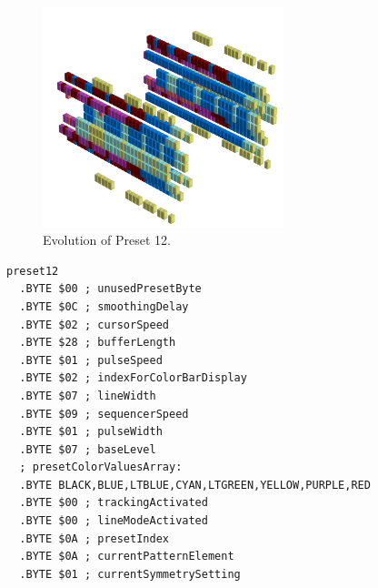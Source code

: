 \vspace*{-0.7cm}
\begin{minipage}[b]{0.48\linewidth}


                                                                 
\begin{figure}[H]                                                          
  \centering                                                             
  \begin{adjustbox}{width=7cm,center}                                   
  \includegraphics[width=7cm]{src/presets/pattern12-45.png}%
  \end{adjustbox}                                                        
\caption{Evolution of Preset 12.}                                           
\end{figure}                                                               
                                                                 
                                                                           
\end{minipage}
\hspace{0.1cm}
\begin{minipage}[b]{0.48\linewidth}                                       
\begin{lstlisting}[basicstyle=\ttfamily\scriptsize,caption=Data structure for Preset 12.]
preset12
  .BYTE $00 ; unusedPresetByte
  .BYTE $0C ; smoothingDelay
  .BYTE $02 ; cursorSpeed
  .BYTE $28 ; bufferLength
  .BYTE $01 ; pulseSpeed
  .BYTE $02 ; indexForColorBarDisplay
  .BYTE $07 ; lineWidth
  .BYTE $09 ; sequencerSpeed
  .BYTE $01 ; pulseWidth
  .BYTE $07 ; baseLevel
  ; presetColorValuesArray: 
  .BYTE BLACK,BLUE,LTBLUE,CYAN,LTGREEN,YELLOW,PURPLE,RED
  .BYTE $00 ; trackingActivated
  .BYTE $00 ; lineModeActivated
  .BYTE $0A ; presetIndex
  .BYTE $0A ; currentPatternElement
  .BYTE $01 ; currentSymmetrySetting
\end{lstlisting}
\end{minipage}

